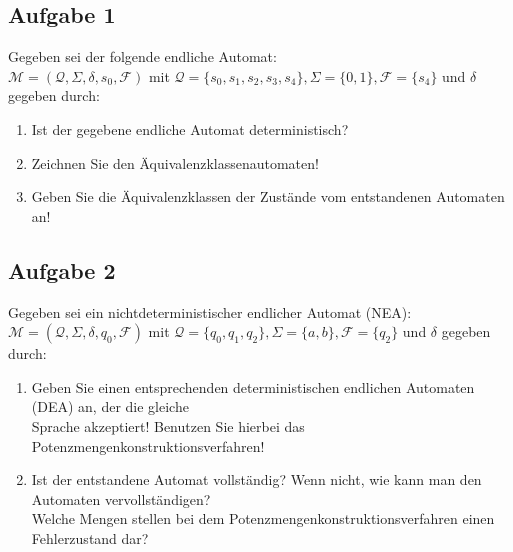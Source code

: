 \documentclass[10pt,oneside,onecolumn,a4paper,german,titlepage]{article}
\begin{document}
\subsection*{Aufgabe 1}
Gegeben sei der folgende endliche Automat:\\
$\mathcal{M} = (\mathcal{Q},\Sigma,\delta,s_0,\mathcal{F})$ mit
$\mathcal{Q} = \{s_0,s_1,s_2,s_3,s_4\}, \Sigma = \{0,1\}, \mathcal{F} = \{s_4\}$
und $\delta$ gegeben durch:
\begin{center}
\end{center}
\begin{enumerate}
\item Ist der gegebene endliche Automat deterministisch?
\item Zeichnen Sie den Äquivalenzklassenautomaten!
\item Geben Sie die Äquivalenzklassen der Zustände vom entstandenen Automaten an!
\end{enumerate}

\subsection*{Aufgabe 2}
Gegeben sei ein nichtdeterministischer endlicher Automat (NEA):\\
$\mathcal{M} = (\mathcal{Q},\Sigma,\delta,q_0,\mathcal{F})$ mit
$\mathcal{Q} = \{q_0,q_1,q_2\}, \Sigma = \{a,b\}, \mathcal{F} = \{q_2\}$
und $\delta$ gegeben durch:
\begin{center}
\end{center}
\begin{enumerate}
\item Geben Sie einen entsprechenden deterministischen endlichen Automaten
(DEA) an, der die gleiche\\
Sprache akzeptiert! Benutzen Sie hierbei das Potenzmengenkonstruktionsverfahren!
\item Ist der entstandene Automat vollständig? Wenn nicht, wie kann man den
Automaten vervollständigen?\\
Welche Mengen stellen bei dem Potenzmengenkonstruktionsverfahren einen
Fehlerzustand dar?
\end{enumerate}
\end{document}
